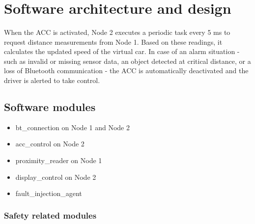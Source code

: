 \section{Software architecture and design}
\label{chapter2}

\paragraph
{}
When the ACC is activated, Node 2 executes a periodic task every 5 ms to request distance measurements from Node 1. Based on these readings, it calculates the updated speed of the virtual car. In case of an alarm situation - such as invalid or missing sensor data, an object detected at critical distance, or a loss of Bluetooth communication - the ACC is automatically deactivated and the driver is alerted to take control.

\subsection{Software modules}

\begin{itemize}
	\item bt\_connection on Node 1 and Node 2
	\item acc\_control on Node 2
	\item proximity\_reader on Node 1
	\item display\_control on Node 2
	\item fault\_injection\_agent
\end{itemize}


\subsubsection{Safety related modules}


